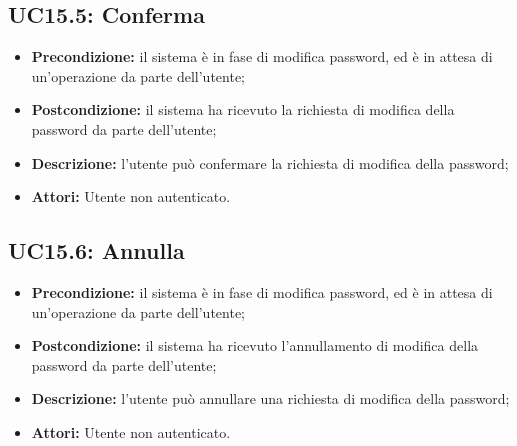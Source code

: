 \subsection{ UC15.5: Conferma}

\begin{itemize}
	\item \textbf{Precondizione:} il sistema è in fase di modifica password, ed è in attesa di un'operazione da parte dell'utente;
	\item \textbf{Postcondizione:} il sistema ha ricevuto la richiesta di modifica della password da parte dell'utente;
	\item \textbf{Descrizione:} l'utente può confermare la richiesta di modifica della password;
	\item \textbf{Attori:} Utente non autenticato.
\end{itemize}
\subsection{ UC15.6: Annulla}

\begin{itemize}
	\item \textbf{Precondizione:} il sistema è in fase di modifica password, ed è in attesa di un'operazione da parte dell'utente;
	\item \textbf{Postcondizione:} il sistema ha ricevuto l'annullamento di modifica della password da parte dell'utente;
	\item \textbf{Descrizione:} l'utente può annullare una richiesta di modifica della password;
	\item \textbf{Attori:} Utente non autenticato.
\end{itemize}
